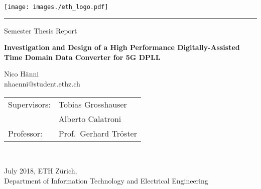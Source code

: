 
\begin{titlepage}
	\tgherosfont

 	\begin{center}
		\begin{minipage}[b]{0.45\linewidth}
			\begin{center}
 				\vspace{0pt}	
 				\texttt{[image: images./eth\_logo.pdf]}
				\hspace{1cm}
			\end{center}
		\end{minipage}
		\hfill
		\begin{minipage}{0.45\textwidth}
			\begin{center}
			\vspace{-1cm}
			\hspace{1cm}
 				\vspace{-0.4cm}
			\end{center}
		\end{minipage}
		
		\vspace{0.1cm}
		\hspace*{0.15cm}\rule{0.985\textwidth}{0.4pt}
		\vspace{0.1cm}
				
		{Semester Thesis Report}
		
		\vfill

		{\Huge\textbf{Investigation and Design of a High 
Performance Digitally-Assisted Time Domain Data Converter for 5G DPLL
}}

		
		\vfill
		
		{\Large Nico Hänni}\\
		{nhaenni@student.ethz.ch}
		
		\vfill
		
		\begin{tabular}{ll}
		 Supervisors: & Tobias Grosshauser \\
		& Alberto Calatroni \\
		 \rule{0pt}{3ex}Professor: & Prof.\ Gerhard Tröster \\
		\end{tabular}\\[2mm]
		
		\vfill

		{July 2018, ETH Zürich,}\\[2mm]
		{Department of Information Technology and Electrical Engineering} \\[2mm]


 \end{center}

\end{titlepage}
